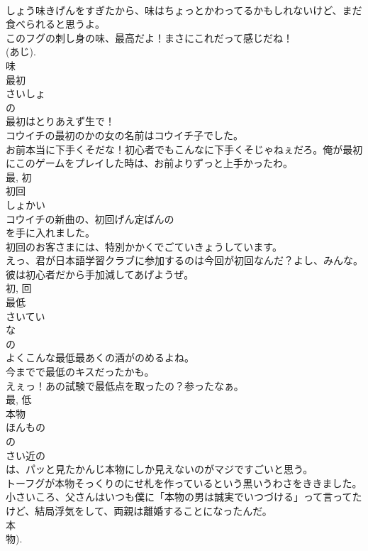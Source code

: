 \documentclass[8pt]{extreport}
\begin{document}
\begin{CJK}{UTF8}{min}
\\	しょう味きげんをすぎたから、味はちょっとかわってるかもしれないけど、まだ食べられると思うよ。	
\\	このフグの刺し身の味、最高だよ！まさにこれだって感じだね！	
\\	(あじ). 
\\	味	
\\	最初	
\\	さいしょ	
\\	の 
\\	最初はとりあえず生で！	
\\	コウイチの最初のかの女の名前はコウイチ子でした。	
\\	お前本当に下手くそだな！初心者でもこんなに下手くそじゃねぇだろ。俺が最初にこのゲームをプレイした時は、お前よりずっと上手かったわ。	
\\	最, 初	
\\	初回	
\\	しょかい	
\\	コウイチの新曲の、初回げん定ばんの
\\	を手に入れました。	
\\	初回のお客さまには、特別かかくでごていきょうしています。	
\\	えっ、君が日本語学習クラブに参加するのは今回が初回なんだ？よし、みんな。彼は初心者だから手加減してあげようぜ。	
\\	初, 回	
\\	最低	
\\	さいてい	
\\	な 
\\	の 
\\	よくこんな最低最あくの酒がのめるよね。	
\\	今までで最低のキスだったかも。	
\\	えぇっ！あの試験で最低点を取ったの？参ったなぁ。	
\\	最, 低	
\\	本物	
\\	ほんもの	
\\	の 
\\	さい近の
\\	は、パッと見たかんじ本物にしか見えないのがマジですごいと思う。	
\\	トーフグが本物そっくりのにせ札を作っているという黒いうわさをききました。	
\\	小さいころ、父さんはいつも僕に「本物の男は誠実でいつづける」って言ってたけど、結局浮気をして、両親は離婚することになったんだ。	
\\	本 
\\	物). 

\end{CJK}
\end{document}
